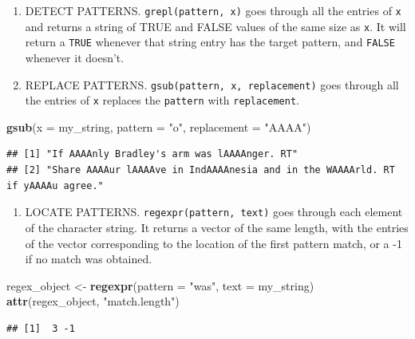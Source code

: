 \documentclass[
]{book}
\newenvironment{Shaded}{\begin{snugshade}}{\end{snugshade}}
\newcommand{\DataTypeTok}[1]{\textcolor[rgb]{0.13,0.29,0.53}{#1}}
\newcommand{\KeywordTok}[1]{\textcolor[rgb]{0.13,0.29,0.53}{\textbf{#1}}}
\newcommand{\NormalTok}[1]{#1}
\newcommand{\StringTok}[1]{\textcolor[rgb]{0.31,0.60,0.02}{#1}}
\providecommand{\tightlist}{%
  \setlength{\itemsep}{0pt}\setlength{\parskip}{0pt}}
\theoremstyle{definition}
\theoremstyle{definition}
\theoremstyle{definition}
\theoremstyle{remark}
\begin{document}
\begin{enumerate}
\def\labelenumi{\arabic{enumi}.}
\item
  DETECT PATTERNS. \texttt{grepl(pattern,\ x)} goes through all the entries of \texttt{x} and returns a string of TRUE and FALSE values of the same size as \texttt{x}. It will return a \texttt{TRUE} whenever that string entry has the target pattern, and \texttt{FALSE} whenever it doesn't.
\item
  REPLACE PATTERNS. \texttt{gsub(pattern,\ x,\ replacement)} goes through all the entries of \texttt{x} replaces the \texttt{pattern} with \texttt{replacement}.
\end{enumerate}

\begin{Shaded}
\begin{Highlighting}[]
\KeywordTok{gsub}\NormalTok{(}\DataTypeTok{x =}\NormalTok{ my\_string,}
     \DataTypeTok{pattern =} \StringTok{"o"}\NormalTok{, }
     \DataTypeTok{replacement =} \StringTok{"AAAA"}\NormalTok{)}
\end{Highlighting}
\end{Shaded}

\begin{verbatim}
## [1] "If AAAAnly Bradley's arm was lAAAAnger. RT"                                   
## [2] "Share AAAAur lAAAAve in IndAAAAnesia and in the WAAAArld. RT if yAAAAu agree."
\end{verbatim}

\begin{enumerate}
\def\labelenumi{\arabic{enumi}.}
\setcounter{enumi}{2}
\tightlist
\item
  LOCATE PATTERNS. \texttt{regexpr(pattern,\ text)} goes through each element of the character string. It returns a vector of the same length, with the entries of the vector corresponding to the location of the first pattern match, or a -1 if no match was obtained.
\end{enumerate}

\begin{Shaded}
\begin{Highlighting}[]
\NormalTok{regex\_object <{-}}\StringTok{ }\KeywordTok{regexpr}\NormalTok{(}\DataTypeTok{pattern =} \StringTok{"was"}\NormalTok{,  }\DataTypeTok{text =}\NormalTok{ my\_string)}
\KeywordTok{attr}\NormalTok{(regex\_object, }\StringTok{"match.length"}\NormalTok{)}
\end{Highlighting}
\end{Shaded}

\begin{verbatim}
## [1]  3 -1
\end{verbatim}
\end{document}
